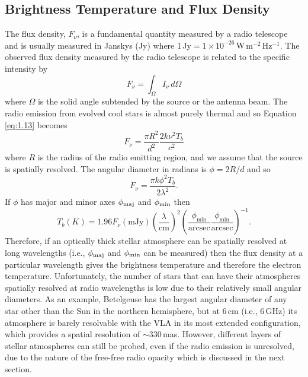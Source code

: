 \subsection{Brightness Temperature and Flux Density}\label{sec:1.8.2}
The flux density, $F_{\nu}$, is a fundamental quantity measured by a radio telescope and is usually measured in Janskys (Jy) where 1\,Jy$ = 1\times 10^{-26}$\,W\,m$^{-2}$\,Hz$^{-1}$. The observed flux density measured by the radio telescope is related to the specific intensity by
\begin{equation}\label{eq:1.13}
F_{\nu} = \int _{\Omega} I_{\nu}\,d\Omega
\end{equation}
where $\Omega$ is the solid angle subtended by the source or the antenna beam. The radio emission from evolved cool stars is almost purely thermal and so Equation \ref{eq:1.13} becomes 
\begin{equation}
F_{\nu} =  \frac{\pi R^2}{d^2}\frac{2k\nu ^2T_{b}}{c^2}
\end{equation}
where $R$ is the radius of the radio emitting region, and we assume that the source is spatially resolved. The angular diameter in radians is $\phi =2R/d$ and so
\begin{equation}
F_{\nu}=\frac{\pi k\phi ^2 T_b}{2\lambda ^2}.
\end{equation}
If $\phi $ has major and minor axes $\phi _{\rm{maj}}$ and $\phi _{\rm{min}}$ then \citep{lim_1998}
\begin{equation}\label{eq:1.43aa}
T_{b} (K)=1.96F_{\nu}(\mathrm{mJy})\left(\frac{\lambda}{\mathrm{cm}}\right)^2\left(\frac{\phi _{\mathrm{min}}}{\mathrm{arcsec}} \frac{\phi _{\mathrm{min}}}{\mathrm{arcsec}}\right)^{-1}.
\end{equation}
Therefore, if an optically thick stellar atmosphere can be spatially resolved at long wavelengths (i.e., $\phi _{\rm{maj}}$ and $\phi _{\rm{min}}$ can be measured) then the flux density at a particular wavelength gives the brightness temperature and therefore the electron temperature. Unfortunately, the number of stars that can have their atmospheres spatially resolved at radio wavelengths is low due to their relatively small angular diameters. As an example, Betelgeuse has the largest angular diameter of any star other than the Sun in the northern hemisphere, but at 6\,cm (i.e., 6\,GHz) its atmosphere is barely resolvable with the VLA in its most extended configuration, which provides a spatial resolution of $\sim 330$\,mas. However, different layers of stellar atmospheres can still be probed, even if the radio emission is unresolved, due to the nature of the free-free radio opacity which is discussed in the next section.

